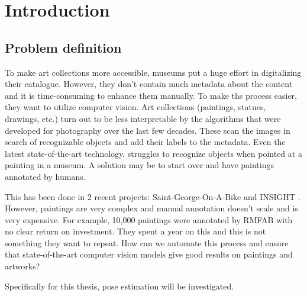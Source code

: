 \chapter{Introduction}
\label{chap:intro}

\section{Problem definition}

To make art collections more accessible, museums put a huge effort in digitalizing their catalogue.
However, they don't contain much metadata about the content and it is time-consuming to enhance them manually.
To make ths process easier, they want to utilize computer vision.
Art collections (paintings, statues, drawings, etc.) turn out to be less interpretable by the algorithms that were developed for photography over the last few decades.
These scan the images in search of recognizable objects and add their labels to the metadata.
Even the latest state-of-the-art technology, struggles to recognize objects when pointed at a painting in a museum.  
A solution may be to start over and have paintings annotated by humans.  
  
This has been done in 2 recent projects:  Saint-George-On-A-Bike \cite{GeorgeOnABike} and INSIGHT \cite{Insight}.
However, paintings are very complex and manual annotation doesn't scale and is very expensive.
For example, 10,000 paintings were annotated by \gls{RMFAB} with no clear return on investment.
They spent a year on this and this is not something they want to repeat.
How can we automate this process and ensure that state-of-the-art computer vision models give good results on paintings and artworks?  
  
Specifically for this thesis, pose estimation will be investigated.


